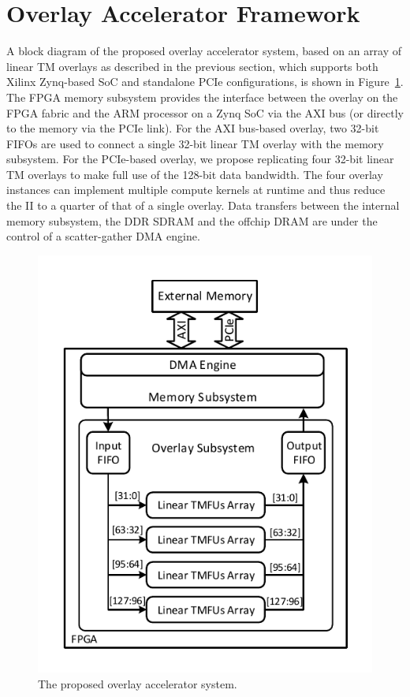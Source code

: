\section{Overlay Accelerator Framework}
\label{section_4}
A block diagram of the proposed overlay accelerator system, based on an array of linear TM overlays as described in the previous section, which supports both Xilinx Zynq-based SoC and standalone PCIe configurations, is shown in Figure~\ref{system}. 
The FPGA memory subsystem provides the interface between the overlay on the FPGA fabric and the ARM processor on a Zynq SoC via the AXI bus (or directly to the memory via the PCIe link). 
For the AXI bus-based overlay, two 32-bit FIFOs are used to connect a single 32-bit linear TM overlay with the memory subsystem. 
For the PCIe-based overlay, we propose replicating four 32-bit linear TM overlays to make full use of the 128-bit data bandwidth. The four overlay instances can implement multiple compute kernels at runtime and thus reduce the II to a quarter of that of a single overlay. 
Data transfers between the internal memory subsystem, the DDR SDRAM and the offchip DRAM are under the control of a scatter-gather DMA engine. 

\begin{figure}[tb]
	\centering
	\includegraphics[width=\columnwidth]{Figures/system_new.pdf}
	\caption{The proposed overlay accelerator system.}
	\label{system}
\end{figure}

